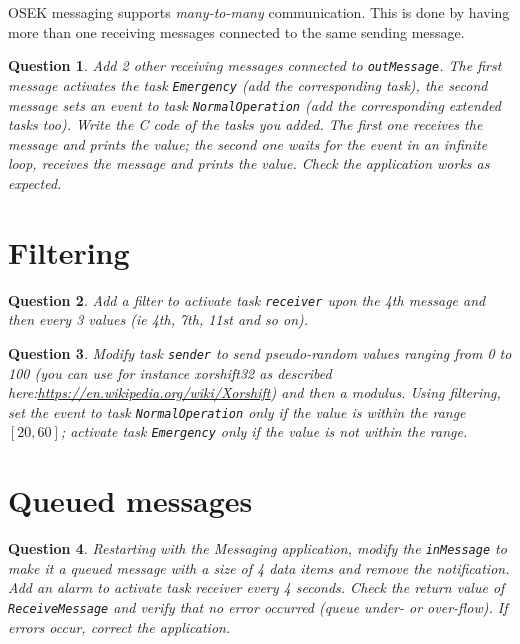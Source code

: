 \documentclass[11pt]{report}
\newtheorem{ex}{Question}
\begin{document}
OSEK messaging supports \emph{many-to-many} communication. This is done by having more than one receiving messages connected to the same sending message.
\begin{ex}
Add 2 other receiving messages connected to \texttt{outMessage}. The first message activates the task \texttt{Emergency} (add the corresponding task), the second message sets an event to task \texttt{NormalOperation} (add the corresponding extended tasks too). Write the C code of the tasks you added. The first one receives the message and prints the value; the second one waits for the event in an infinite loop, receives the message and prints the value. Check the application works as expected.
\end{ex}

\section{Filtering}

\begin{ex}
Add a filter to activate task \texttt{receiver} upon the 4th message and then every 3 values (ie 4th, 7th, 11st and so on).
\end{ex}

\begin{ex}
    Modify task \texttt{sender} to send  pseudo-random values ranging from 0 to 100 (you can use for instance xorshift32 as described here:\url{https://en.wikipedia.org/wiki/Xorshift}) and then a modulus.
    Using filtering, set the event to task \texttt{NormalOperation} only if the value is within the range $[20,60]$; activate task \texttt{Emergency} only if the value is not within the range.
\end{ex}

\section{Queued messages}


\begin{ex}
    Restarting with the Messaging application, modify the \texttt{inMessage} to make it a queued message with a size of 4 data items and remove the notification. Add an alarm to activate task receiver every 4 seconds. Check the return value of \texttt{ReceiveMessage} and verify that no error occurred (queue under- or over-flow). If errors occur, correct the application.
\end{ex}
\end{document}
